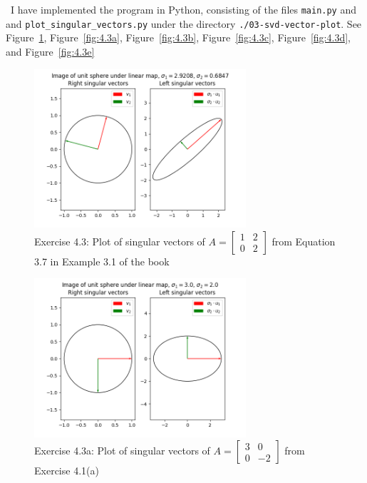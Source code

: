 \documentclass[12pt]{article}
\newenvironment{sol}[1][Solution]{\begin{trivlist}
		\item[\hskip \labelsep {\bfseries #1:}]}{\end{trivlist}}
\begin{document}
\begin{sol}
	\
	I have implemented the program in Python, consisting of the files \texttt{main.py} and
	and \texttt{plot\_singular\_vectors.py} under the directory \texttt{./03-svd-vector-plot}.
	See Figure~\ref{fig:4.3-eq3.7}, Figure~\ref{fig:4.3a}, Figure~\ref{fig:4.3b}, Figure~\ref{fig:4.3c},
	Figure~\ref{fig:4.3d}, and Figure~\ref{fig:4.3e}
	
	\begin{figure}
		\centering
		\includegraphics[width=0.7\textwidth]{eq37_plot_of_singular_vectors}
		\caption{Exercise 4.3: Plot of singular vectors of $A=\begin{bmatrix}
			1 & 2\\
			0 & 2
		\end{bmatrix}$ from Equation 3.7 in Example 3.1 of the book}
		\label{fig:4.3-eq3.7}
	\end{figure}
	\begin{figure}
		\centering
		\includegraphics[width=0.7\textwidth]{a_plot_of_singular_vectors}
		\caption{Exercise 4.3a: Plot of singular vectors of $A=\begin{bmatrix}
				3 & 0\\
				0 & -2
			\end{bmatrix}$ from Exercise 4.1(a)}

\end{figure}
\end{sol}
\end{document}
